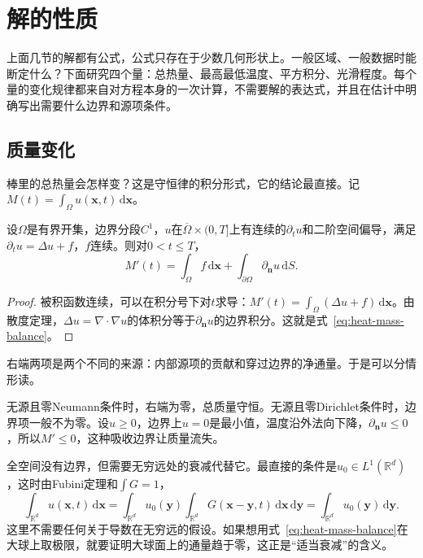\section{解的性质}
\label{sec:heat-properties}

上面几节的解都有公式，公式只存在于少数几何形状上。一般区域、一般数据时能断定什么？下面研究四个量：总热量、最高最低温度、平方积分、光滑程度。每个量的变化规律都来自对方程本身的一次计算，不需要解的表达式，并且在估计中明确写出需要什么边界和源项条件。

\subsection{质量变化}
\label{sec:heat-mass}

棒里的总热量会怎样变？这是守恒律的积分形式，它的结论最直接。记$M(t)=\int_\Omega u(\bm{x},t)\,\mathrm{d}\bm{x}$。

\begin{theorem}[质量平衡]
\label{thm:heat-mass-balance}
设$\Omega$是有界开集，边界分段$C^1$，$u$在$\overline\Omega\times(0,T]$上有连续的$\partial_tu$和二阶空间偏导，满足$\partial_tu=\Delta u+f$，$f$连续。则对$0<t\leq T$，
\begin{equation}
 M'(t)=\int_\Omega f\,\mathrm{d}\bm{x}+\int_{\partial\Omega}\partial_{\bm{n}}u\,\mathrm{d}S .
 \label{eq:heat-mass-balance}
\end{equation}
\end{theorem}

\begin{proof}
被积函数连续，可以在积分号下对$t$求导：$M'(t)=\int_\Omega(\Delta u+f)\,\mathrm{d}\bm{x}$。由散度定理，$\Delta u=\nabla\cdot\nabla u$的体积分等于$\partial_{\bm{n}}u$的边界积分。这就是式~\eqref{eq:heat-mass-balance}。
\end{proof}

右端两项是两个不同的来源：内部源项的贡献和穿过边界的净通量。于是可以分情形读。

无源且零Neumann条件时，右端为零，总质量守恒。无源且零Dirichlet条件时，边界项一般不为零。设$u\geq0$，边界上$u=0$是最小值，温度沿外法向下降，$\partial_{\bm{n}}u\leq0$，所以$M'\leq0$，这种吸收边界让质量流失。

全空间没有边界，但需要无穷远处的衰减代替它。最直接的条件是$u_0\in L^1(\mathbb{R}^{d})$，这时由Fubini定理和$\int G=1$，
\[
 \int_{\mathbb{R}^{d}}u(\bm{x},t)\,\mathrm{d}\bm{x}=\int_{\mathbb{R}^{d}}u_0(\bm{y})\int_{\mathbb{R}^{d}}G(\bm{x}-\bm{y},t)\,\mathrm{d}\bm{x}\,\mathrm{d}\bm{y}=\int_{\mathbb{R}^{d}}u_0(\bm{y})\,\mathrm{d}\bm{y} .
\]
这里不需要任何关于导数在无穷远的假设。如果想用式~\eqref{eq:heat-mass-balance}在大球上取极限，就要证明大球面上的通量趋于零，这正是“适当衰减”的含义。

